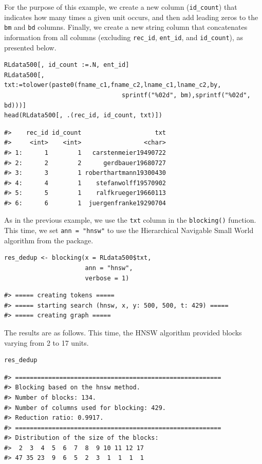 For the purpose of this example, we create a new column (\texttt{id\_count})
that indicates how many times a given unit occurs, and then add leading
zeros to the \texttt{bm} and \texttt{bd} columns. Finally, we create a new string
column that concatenates information from all columns (excluding
\texttt{rec\_id}, \texttt{ent\_id}, and \texttt{id\_count}), as presented below.

\begin{verbatim}
RLdata500[, id_count :=.N, ent_id]
RLdata500[, txt:=tolower(paste0(fname_c1,fname_c2,lname_c1,lname_c2,by,
                                sprintf("%02d", bm),sprintf("%02d", bd)))]
head(RLdata500[, .(rec_id, id_count, txt)])
\end{verbatim}

\begin{verbatim}
#>    rec_id id_count                    txt
#>     <int>    <int>                 <char>
#> 1:      1        1   carstenmeier19490722
#> 2:      2        2      gerdbauer19680727
#> 3:      3        1 roberthartmann19300430
#> 4:      4        1    stefanwolff19570902
#> 5:      5        1    ralfkrueger19660113
#> 6:      6        1  juergenfranke19290704
\end{verbatim}

As in the previous example, we use the \texttt{txt} column in the \texttt{blocking()}
function. This time, we set \texttt{ann\ =\ "hnsw"} to use the Hierarchical
Navigable Small World \citep[HNSW,][]{malkov2018efficient} algorithm from the
 package.

\begin{verbatim}
res_dedup <- blocking(x = RLdata500$txt,
                      ann = "hnsw",
                      verbose = 1)
\end{verbatim}

\begin{verbatim}
#> ===== creating tokens =====
#> ===== starting search (hnsw, x, y: 500, 500, t: 429) =====
#> ===== creating graph =====
\end{verbatim}

The results are as follows. This time, the HNSW algorithm provided
blocks varying from 2 to 17 units.


\begin{verbatim}
res_dedup
\end{verbatim}

\begin{verbatim}
#> ========================================================
#> Blocking based on the hnsw method.
#> Number of blocks: 134.
#> Number of columns used for blocking: 429.
#> Reduction ratio: 0.9917.
#> ========================================================
#> Distribution of the size of the blocks:
#>  2  3  4  5  6  7  8  9 10 11 12 17 
#> 47 35 23  9  6  5  2  3  1  1  1  1
\end{verbatim}

